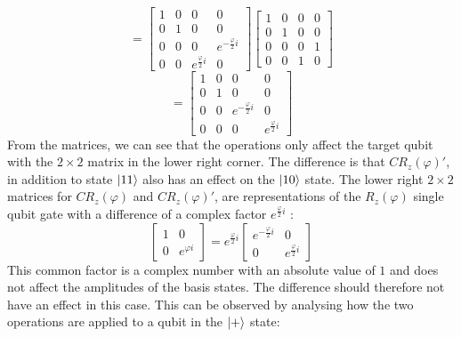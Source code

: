 \documentclass[12pt,a4paper]{article}
\begin{document}
    \[
    = 
    \begin{bmatrix}
        1 & 0 & 0 & 0 \\
        0 & 1 & 0 & 0 \\
        0 & 0 & 0 & e^{-\frac{\varphi}{2} i} \\
        0 & 0 & e^{\frac{\varphi}{2} i} & 0
    \end{bmatrix}
    \begin{bmatrix}
        1 & 0 & 0 & 0 \\
        0 & 1 & 0 & 0 \\
        0 & 0 & 0 & 1 \\
        0 & 0 & 1 & 0
    \end{bmatrix} 
    \]
    \[
    = 
    \begin{bmatrix}
        1 & 0 & 0 & 0 \\
        0 & 1 & 0 & 0 \\
        0 & 0 & e^{-\frac{\varphi}{2} i}  & 0\\
        0 & 0 & 0 & e^{\frac{\varphi}{2} i}
    \end{bmatrix}
\]
From the matrices, we can see that the operations only affect the target qubit with the \(2\times2\) matrix in the lower right corner. The difference is that \(CR_z(\varphi)'\), in addition to state \(\ket{11}\) also has an effect on the \(\ket{10}\) state. The lower right \(2\times2\) matrices for \(CR_z(\varphi)\) and \(CR_z(\varphi)'\), are representations of the \(R_z(\varphi)\) single qubit gate with a difference of a complex factor \(e^{\frac{\varphi}{2}i}\) \cite[p. 261]{sutor_dancing_2019}:
\[
\begin{bmatrix}
1 & 0 \\
0 & e^{\varphi i}
\end{bmatrix} 
= e^{\frac{\varphi}{2}i}
\begin{bmatrix}
e^{-\frac{\varphi}{2}i} & 0 \\
0 & e^{\frac{\varphi}{2}i}
\end{bmatrix} 
\]
This common factor is a complex number with an absolute value of \(1\) and does not affect the amplitudes of the basis states. The difference should therefore not have an effect in this case. This can be observed by analysing how the two operations are applied to a qubit in the \(\ket{+}\) state:
\end{document}
